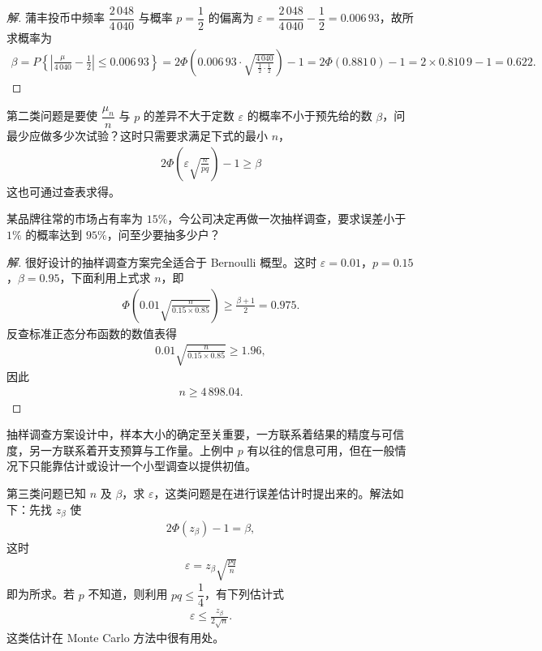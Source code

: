 \documentclass[../../main.tex]{subfiles}
\begin{document}
\begin{proof}[解]
蒲丰投币中频率 $\dfrac{2\,048}{4\,040}$ 与概率 $p=\dfrac12$ 的偏离为 $\varepsilon=\dfrac{2\,048}{4\,040}-\dfrac12=0.006\,93$，故所求概率为
\begin{align*}
\beta=P\!\left\{\left|\frac{\mu}{4\,040}-\frac12\right|\leqslant 0.006\,93\right\}
=2\Phi\!\left(0.006\,93\cdot\sqrt{\frac{4\,040}{\frac12\cdot\frac12}}\right)-1
=2\Phi(0.881\,0)-1=2\times0.810\,9-1=0.622.
\end{align*}
\end{proof}

第二类问题是要使 $\dfrac{\mu_n}{n}$ 与 $p$ 的差异不大于定数 $\varepsilon$ 的概率不小于预先给的数 $\beta$，问最少应做多少次试验？这时只需要求满足下式的最小 $n$，
\begin{align}
2\Phi\!\left(\varepsilon\sqrt{\frac{n}{pq}}\right)-1\geqslant\beta
\end{align}
这也可通过查表求得。

\begin{example}[市场占有率抽样调查]\label{example:ch05-市场占有率抽样}
某品牌往常的市场占有率为 $15\%$，今公司决定再做一次抽样调查，要求误差小于 $1\%$ 的概率达到 $95\%$，问至少要抽多少户？
\end{example}

\begin{proof}[解]
很好设计的抽样调查方案完全适合于 Bernoulli 概型。这时 $\varepsilon=0.01$，$p=0.15$，$\beta=0.95$，下面利用上式求 $n$，即
\begin{align*}
\Phi\!\left(0.01\sqrt{\frac{n}{0.15\times0.85}}\right)\geqslant\frac{\beta+1}{2}=0.975.
\end{align*}
反查标准正态分布函数的数值表得
\begin{align*}
0.01\sqrt{\frac{n}{0.15\times0.85}}\geqslant 1.96,
\end{align*}
因此
\begin{align*}
n\geqslant 4\,898.04.
\end{align*}
\end{proof}

抽样调查方案设计中，样本大小的确定至关重要，一方联系着结果的精度与可信度，另一方联系着开支预算与工作量。上例中 $p$ 有以往的信息可用，但在一般情况下只能靠估计或设计一个小型调查以提供初值。

第三类问题已知 $n$ 及 $\beta$，求 $\varepsilon$，这类问题是在进行误差估计时提出来的。解法如下：先找 $z_\beta$ 使
\begin{align*}
2\Phi(z_\beta)-1=\beta,
\end{align*}
这时
\begin{align}
\varepsilon=z_\beta\sqrt{\frac{pq}{n}}
\end{align}
即为所求。若 $p$ 不知道，则利用 $pq\leqslant\dfrac14$，有下列估计式
\begin{align}
\varepsilon\leqslant\frac{z_\beta}{2\sqrt{n}}.
\end{align}
这类估计在 Monte Carlo 方法中很有用处。
\end{document}
